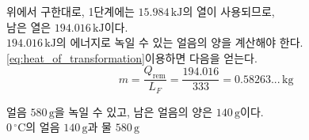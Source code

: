 {\begin{solbox}
%
\bn 위에서 구한대로, 1단계에는 $15.984\,\mathrm{kJ}$의 열이 사용되므로, \\
\bns 남은 열은 $194.016\,\mathrm{kJ}$이다. \\

%
\bn $194.016\,\mathrm{kJ}$의 에너지로 녹일 수 있는 얼음의 양을 계산해야 한다. \\
\bns \autoref{eq:heat_of_transformation}\을 이용하면 다음을 얻는다. \\
\begin{equation*} m = \frac{Q_\text{rem}}{L_F} = \frac{194.016}{333}= 0.58263...\,\mathrm{kg} \end{equation*}

\bn 얼음 $580\,\mathrm{g}$을 녹일 수 있고, 남은 얼음의 양은 $140\,\mathrm{g}$이다.\\

 $0\,^\circ\mathrm{C}$의 얼음 $140\,\mathrm{g}$과 물 $580\,\mathrm{g}$
\end{solbox}
} %
\clearpage
